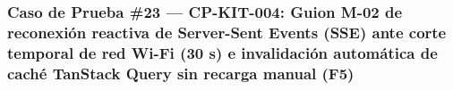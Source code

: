 \documentclass[10pt,a4paper]{article}
\begin{document}
\endgroup\medskip


\subsubsection{Caso de Prueba \#23 --- CP-KIT-004: Guion M-02 de reconexión reactiva de Server-Sent Events (SSE) ante corte temporal de red Wi-Fi (30 s) e invalidación automática de caché TanStack Query sin recarga manual (F5)}\label{caso-de-prueba-23--cp-kit-004-guion-m-02-de-reconexiuxf3n-reactiva-de-server-sent-events-sse-ante-corte-temporal-de-red-wi-fi-30-s-e-invalidaciuxf3n-automuxe1tica-de-cachuxe9-tanstack-query-sin-recarga-manual-f5}

\begingroup\singlespacing\footnotesize\setlength{\parskip}{0pt}
\end{document}
